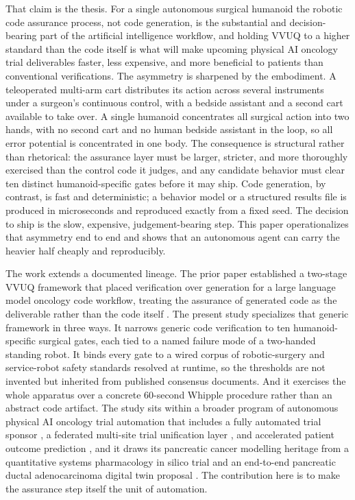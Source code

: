 That claim is the thesis. For a single autonomous surgical humanoid the robotic
code assurance process, not code generation, is the substantial and
decision-bearing part of the artificial intelligence workflow, and holding VVUQ
to a higher standard than the code itself is what will make upcoming physical AI
oncology trial deliverables faster, less expensive, and more beneficial to
patients than conventional verifications. The asymmetry is sharpened by the
embodiment. A teleoperated multi-arm cart distributes its action across several
instruments under a surgeon's continuous control, with a bedside assistant and a
second cart available to take over. A single humanoid concentrates all surgical
action into two hands, with no second cart and no human bedside assistant in the
loop, so all error potential is concentrated in one body. The consequence is
structural rather than rhetorical: the assurance layer must be larger, stricter,
and more thoroughly exercised than the control code it judges, and any candidate
behavior must clear ten distinct humanoid-specific gates before it may ship. Code
generation, by contrast, is fast and deterministic; a behavior model or a
structured results file is produced in microseconds and reproduced exactly from a
fixed seed. The decision to ship is the slow, expensive, judgement-bearing step.
This paper operationalizes that asymmetry end to end and shows that an autonomous
agent can carry the heavier half cheaply and reproducibly.

The work extends a documented lineage. The prior paper established a two-stage
VVUQ framework that placed verification over generation for a large language
model oncology code workflow, treating the assurance of generated code as the
deliverable rather than the code itself \cite{kawchak2026vvuq01}. The present
study specializes that generic framework in three ways. It narrows generic code
verification to ten humanoid-specific surgical gates, each tied to a named
failure mode of a two-handed standing robot. It binds every gate to a wired
corpus of robotic-surgery and service-robot safety standards resolved at runtime,
so the thresholds are not invented but inherited from published consensus
documents. And it exercises the whole apparatus over a concrete 60-second Whipple
procedure rather than an abstract code artifact. The study sits within a broader
program of autonomous physical AI oncology trial automation that includes a fully
automated trial sponsor \cite{kawchak2026sponsor}, a federated multi-site trial
unification layer \cite{kawchak2026federated}, and accelerated patient outcome
prediction \cite{kawchak2026prediction}, and it draws its pancreatic cancer
modelling heritage from a quantitative systems pharmacology in silico trial
\cite{kawchak2025qsppdac} and an end-to-end pancreatic ductal adenocarcinoma
digital twin proposal \cite{kawchak2025pdactwin}. The contribution here is to
make the assurance step itself the unit of automation.

